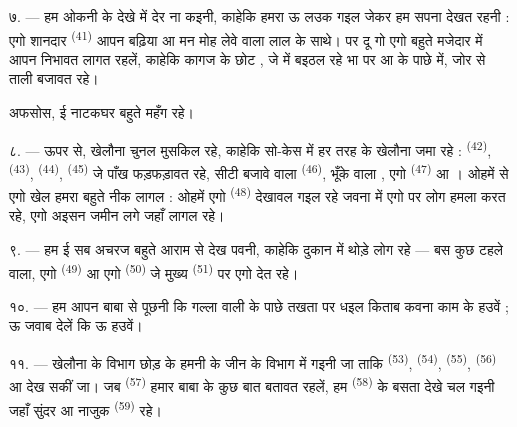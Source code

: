 ७. --- हम ओकनी के देखे में देर ना कइनी, काहेकि हमरा ऊ लउक गइल जेकर हम
सपना देखत रहनी : एगो शानदार  \textsuperscript{(41)}
आपन बढ़िया  आ मन मोह लेवे वाला लाल  के
साथे।  पर दू गो  एगो बहुते मजेदार 
में आपन  निभावत लागत रहलें, काहेकि कागज के छोट
, जे  में बइठल रहे भा  पर आ
 के पाछे  में, जोर से
ताली बजावत रहे।

अफसोस, ई नाटकघर बहुते महँग रहे।

८. --- ऊपर से, खेलौना चुनल मुसकिल रहे, काहेकि सो-केस में हर तरह के
खेलौना जमा रहे :  \textsuperscript{(42)},
 \textsuperscript{(43)}, 
\textsuperscript{(44)},  \textsuperscript{(45)} जे पाँख
फड़फड़ावत रहे, सीटी बजावे वाला  \textsuperscript{(46)},
भूँके वाला , एगो  \textsuperscript{(47)}
आ । ओहमें से एगो खेल हमरा बहुते नीक लागल : ओहमें एगो
 \textsuperscript{(48)} देखावल गइल रहे जवना में एगो
 पर  लोग हमला करत रहे, एगो अइसन
जमीन लगे जहाँ  लागल रहे।


९. --- हम ई सब अचरज बहुते आराम से देख पवनी, काहेकि दुकान में थोड़े लोग
रहे — बस कुछ टहले वाला, एगो  \textsuperscript{(49)}
आ एगो  \textsuperscript{(50)} जे मुख्य 
\textsuperscript{(51)} पर एगो  देत रहे।

१०. --- हम आपन बाबा से पूछनी कि गल्ला वाली के पाछे तखता पर धइल किताब
कवना काम के हउवें ; ऊ जवाब देलें कि ऊ  हउवें।

\VUsaut{3.6mm}
\VUsaut{2.8mm}

११. --- खेलौना के विभाग छोड़ के हमनी के जीन के विभाग में गइनी जा ताकि
 \textsuperscript{(53)},  \textsuperscript{(54)},
 \textsuperscript{(55)},  \textsuperscript{(56)}
आ  देख सकीं जा। जब 
\textsuperscript{(57)} हमार बाबा के कुछ बात बतावत रहलें, हम  \textsuperscript{(58)} के बसता देखे चल गइनी जहाँ सुंदर
 आ नाजुक  \textsuperscript{(59)}
रहे।


